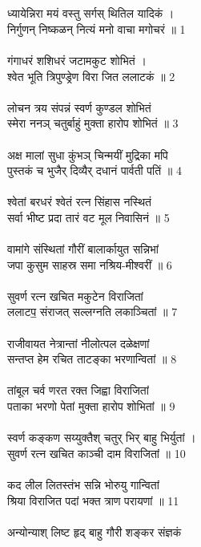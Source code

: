 \section{}
ध्यायेन्निरा मयं वस्तु सर्गस् थितिल यादिकं ।\\
निर्गुणन् निष्कळन् नित्यं मनो वाचा मगोचरं ॥ 1\\
\\
गंगाधरं शशिधरं जटामकुट शोभितं ।\\
श्वेत भूति त्रिपुण्ड्रेण विरा जित ललाटकं ॥ 2\\
\\
लोचन त्रय संपन्नं स्वर्ण कुण्डल शोभितं\\
स्मेरा ननञ् चतुर्बाहुं मुक्ता हारोप शोभितं ॥ 3\\
\\
अक्ष मालां सुधा कुंभञ् चिन्मयीं मुद्रिका मपि\\
पुस्तकं च भुजैर् दिव्यैर् दधानं पार्वती पतिं ॥ 4\\
\\
श्वेतां बरधरं श्वेतं रत्न सिंहास नस्थितं\\
सर्वा भीष्ट प्रदा तारं वट मूल निवासिनं ॥ 5\\
\\
वामांगे संस्थितां गौरीं बालार्कायुत सन्निभां\\
जपा कुसुम साहस्र समा नश्रिय-मीश्वरीं ॥ 6\\
\\
सुवर्ण रत्न खचित मकुटेन विराजितां\\
ललाटप॒ संराजत् सल्लग्नति लकाञ्चितां ॥ 7\\
\\
राजीवायत नेत्रान्तां नीलोत्पल दळेक्षणां\\
सन्तप्त हेम रचित ताटङ्का भरणान्वितां ॥ 8\\
\\
तांबूल चर्व णरत रक्त जिह्वा विराजितां\\
पताका भरणो पेतां मुक्ता हारोप शोभितां ॥ 9\\
\\
स्वर्ण कङ्कण सय्युक्तैश् चतुर् भिर् बाहु भिर्युतां ।\\
सुवर्ण रत्न खचित काञ्ची दाम विराजितां ॥ 10\\
\\
कद लील लितस्तंभ सन्नि भोरुयु गान्वितां\\
श्रिया विराजित पदां भक्त त्राण परायणां ॥ 11\\
\\
अन्योन्याश् लिष्ट हृद् बाहु गौरी शङ्कर संज्ञकं\\
